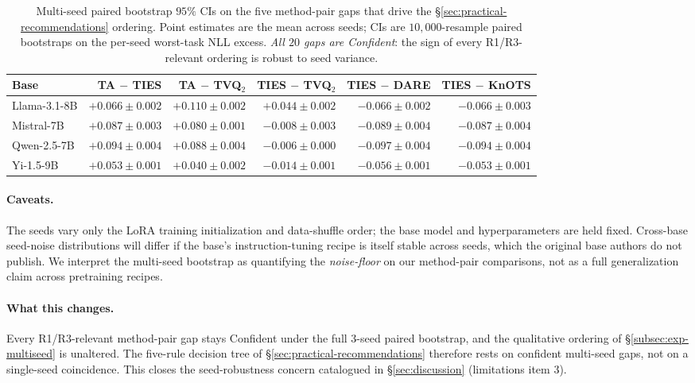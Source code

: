 \begin{table}[t]
\centering
\caption{Multi-seed paired bootstrap $95\%$ CIs on the five
method-pair gaps that drive the
\S\ref{sec:practical-recommendations} ordering. Point estimates are
the mean across seeds; CIs are $10{,}000$-resample paired bootstraps
on the per-seed worst-task NLL excess. \emph{All $20$ gaps are
Confident}: the sign of every R1/R3-relevant ordering is robust to
seed variance.}
\label{tab:multiseed-bootstrap}
\small
\begin{tabular}{lrrrrr}
\hline
Base & TA $-$ TIES & TA $-$ TVQ$_2$ & TIES $-$ TVQ$_2$ & TIES $-$ DARE & TIES $-$ KnOTS \\
\hline
Llama-3.1-8B & $+0.066 \pm 0.002$ & $+0.110 \pm 0.002$ & $+0.044 \pm 0.002$ & $-0.066 \pm 0.002$ & $-0.066 \pm 0.003$ \\
Mistral-7B   & $+0.087 \pm 0.003$ & $+0.080 \pm 0.001$ & $-0.008 \pm 0.003$ & $-0.089 \pm 0.004$ & $-0.087 \pm 0.004$ \\
Qwen-2.5-7B  & $+0.094 \pm 0.004$ & $+0.088 \pm 0.004$ & $-0.006 \pm 0.000$ & $-0.097 \pm 0.004$ & $-0.094 \pm 0.004$ \\
Yi-1.5-9B    & $+0.053 \pm 0.001$ & $+0.040 \pm 0.002$ & $-0.014 \pm 0.001$ & $-0.056 \pm 0.001$ & $-0.053 \pm 0.001$ \\
\hline
\end{tabular}
\end{table}

\paragraph{Caveats.} The seeds vary only the LoRA training
initialization and data-shuffle order; the base model and
hyperparameters are held fixed. Cross-base seed-noise distributions
will differ if the base's instruction-tuning recipe is itself stable
across seeds, which the original base authors do not publish. We
interpret the multi-seed bootstrap as quantifying the
\emph{noise-floor} on our method-pair comparisons, not as a full
generalization claim across pretraining recipes.

\paragraph{What this changes.} Every R1/R3-relevant method-pair gap
stays Confident under the full 3-seed paired bootstrap, and the
qualitative ordering of \S\ref{subsec:exp-multiseed} is unaltered. The
five-rule decision tree of \S\ref{sec:practical-recommendations}
therefore rests on confident multi-seed gaps, not on a single-seed
coincidence. This closes the seed-robustness concern catalogued in
\S\ref{sec:discussion} (limitations item 3).

